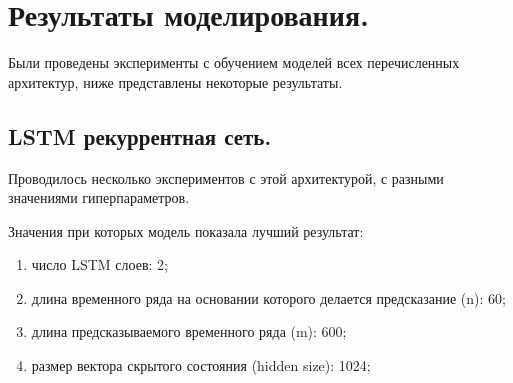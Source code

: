 \documentclass[12pt,a4paper]{article}
\begin{document}
\section{Результаты моделирования.}

Были проведены эксперименты с обучением моделей всех перечисленных архитектур, ниже представлены некоторые результаты.

%
%
%


%

\subsection{LSTM рекуррентная сеть.}

Проводилось несколько экспериментов с этой архитектурой, с разными значениями гиперпараметров. 

\begin{description}
	\item Значения при которых модель показала лучший результат:
	\begin{enumerate}
		\item число LSTM слоев: 2;
		\item длина временного ряда на основании которого делается предсказание (n): 60;
		\item длина предсказываемого временного ряда (m): 600;
		\item размер вектора скрытого состояния (hidden size): 1024;
	\end{enumerate}
\end{description}
\end{document}
